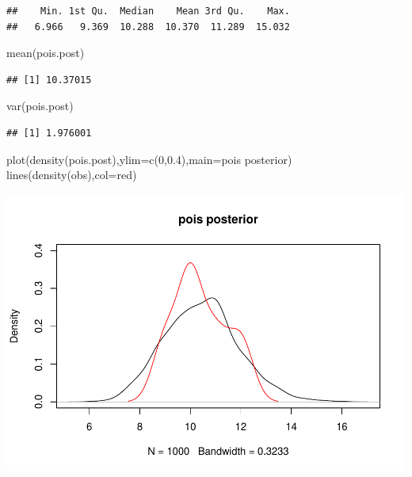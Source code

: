 \documentclass[
]{book}
\newenvironment{Shaded}{\begin{snugshade}}{\end{snugshade}}
\newcommand{\AttributeTok}[1]{\textcolor[rgb]{0.77,0.63,0.00}{#1}}
\newcommand{\DecValTok}[1]{\textcolor[rgb]{0.00,0.00,0.81}{#1}}
\newcommand{\FloatTok}[1]{\textcolor[rgb]{0.00,0.00,0.81}{#1}}
\newcommand{\FunctionTok}[1]{\textcolor[rgb]{0.00,0.00,0.00}{#1}}
\newcommand{\NormalTok}[1]{#1}
\newcommand{\StringTok}[1]{\textcolor[rgb]{0.31,0.60,0.02}{#1}}
\theoremstyle{definition}
\theoremstyle{definition}
\theoremstyle{definition}
\theoremstyle{definition}
\theoremstyle{remark}
\begin{document}
\begin{verbatim}
##    Min. 1st Qu.  Median    Mean 3rd Qu.    Max. 
##   6.966   9.369  10.288  10.370  11.289  15.032
\end{verbatim}

\begin{Shaded}
\begin{Highlighting}[]
  \FunctionTok{mean}\NormalTok{(pois.post)}
\end{Highlighting}
\end{Shaded}

\begin{verbatim}
## [1] 10.37015
\end{verbatim}

\begin{Shaded}
\begin{Highlighting}[]
  \FunctionTok{var}\NormalTok{(pois.post)}
\end{Highlighting}
\end{Shaded}

\begin{verbatim}
## [1] 1.976001
\end{verbatim}

\begin{Shaded}
\begin{Highlighting}[]
  \FunctionTok{plot}\NormalTok{(}\FunctionTok{density}\NormalTok{(pois.post),}\AttributeTok{ylim=}\FunctionTok{c}\NormalTok{(}\DecValTok{0}\NormalTok{,}\FloatTok{0.4}\NormalTok{),}\AttributeTok{main=}\StringTok{\textquotesingle{}pois posterior\textquotesingle{}}\NormalTok{)}
  \FunctionTok{lines}\NormalTok{(}\FunctionTok{density}\NormalTok{(obs),}\AttributeTok{col=}\StringTok{\textquotesingle{}red\textquotesingle{}}\NormalTok{)}
\end{Highlighting}
\end{Shaded}

\includegraphics{_main_files/figure-latex/unnamed-chunk-39-2.pdf}
\end{document}
